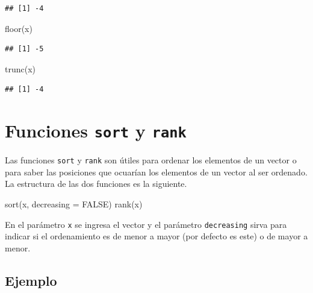 \documentclass[
]{book}
\makeatletter
\newenvironment{Shaded}{\begin{snugshade}}{\end{snugshade}}
\newcommand{\AttributeTok}[1]{\textcolor[rgb]{0.77,0.63,0.00}{#1}}
\newcommand{\ConstantTok}[1]{\textcolor[rgb]{0.00,0.00,0.00}{#1}}
\newcommand{\FunctionTok}[1]{\textcolor[rgb]{0.00,0.00,0.00}{#1}}
\newcommand{\NormalTok}[1]{#1}
\newenvironment{kframe}{%
\medskip{}
\setlength{\fboxsep}{.8em}
 \def\at@end@of@kframe{}%
 \ifinner\ifhmode%
  \def\at@end@of@kframe{\end{minipage}}%
  \begin{minipage}{\columnwidth}%
 \fi\fi%
 \def\FrameCommand##1{\hskip\@totalleftmargin \hskip-\fboxsep
 \colorbox{shadecolor}{##1}\hskip-\fboxsep
     \hskip-\linewidth \hskip-\@totalleftmargin \hskip\columnwidth}%
 \MakeFramed {\advance\hsize-\width
   \@totalleftmargin\z@ \linewidth\hsize
   \@setminipage}}%
 {\par\unskip\endMakeFramed%
 \at@end@of@kframe}
\renewenvironment{Shaded}{\begin{kframe}}{\end{kframe}}
\makeatother
\begin{document}
\begin{verbatim}
## [1] -4
\end{verbatim}

\begin{Shaded}
\begin{Highlighting}[]
\FunctionTok{floor}\NormalTok{(x)}
\end{Highlighting}
\end{Shaded}

\begin{verbatim}
## [1] -5
\end{verbatim}

\begin{Shaded}
\begin{Highlighting}[]
\FunctionTok{trunc}\NormalTok{(x)}
\end{Highlighting}
\end{Shaded}

\begin{verbatim}
## [1] -4
\end{verbatim}

\hypertarget{funciones-sort-y-rank}{%
\section{\texorpdfstring{Funciones \texttt{sort} y \texttt{rank}}{Funciones sort y rank}}\label{funciones-sort-y-rank}}

Las funciones \texttt{sort} y \texttt{rank} son útiles para ordenar los elementos de un vector o para saber las posiciones que ocuarían los elementos de un vector al ser ordenado. La estructura de las dos funciones es la siguiente.

\begin{Shaded}
\begin{Highlighting}[]
\FunctionTok{sort}\NormalTok{(x, }\AttributeTok{decreasing =} \ConstantTok{FALSE}\NormalTok{)}
\FunctionTok{rank}\NormalTok{(x)}
\end{Highlighting}
\end{Shaded}

En el parámetro \texttt{x} se ingresa el vector y el parámetro \texttt{decreasing} sirva para indicar si el ordenamiento es de menor a mayor (por defecto es este) o de mayor a menor.

\hypertarget{ejemplo-14}{%
\subsection*{Ejemplo}\label{ejemplo-14}}
\end{document}
